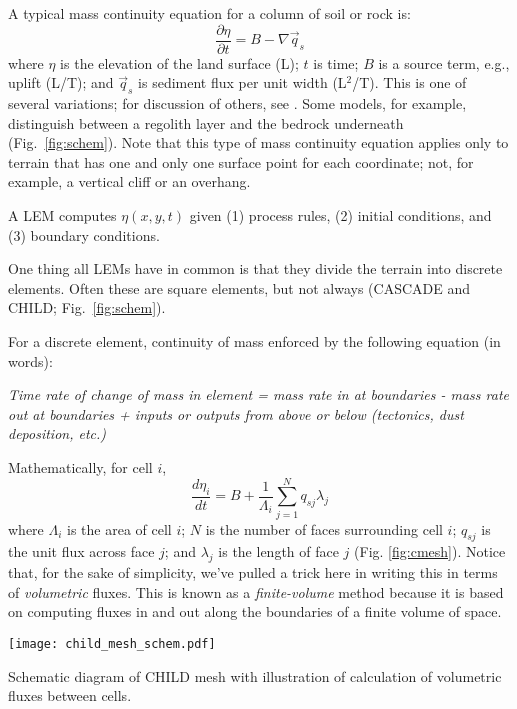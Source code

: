 \documentclass[12pt,reqno]{amsart}
\begin{document}
A typical mass continuity equation for a column of soil or rock is:
\begin{equation}
\frac{\partial \eta}{\partial t} = B - \nabla \vec{q}_s
\end{equation}
where $\eta$ is the elevation of the land surface (L); $t$ is time; $B$ is a source term, e.g., uplift (L/T); and $\vec{q}_s$ is sediment flux per unit width (L$^2$/T). This is one of several variations; for discussion of others, see \cite{tucker2010modelling}. Some models, for example, distinguish between a regolith layer and the bedrock underneath (Fig.~\ref{fig:schem}). Note that this type of mass continuity equation applies only to terrain that has one and only one surface point for each coordinate; not, for example, a vertical cliff or an overhang.

A LEM computes $\eta (x,y,t)$ given (1) process rules, (2) initial conditions, and (3) boundary conditions.

One thing all LEMs have in common is that they divide the terrain into discrete elements. Often these are square elements, but not always (CASCADE and CHILD; Fig.~\ref{fig:schem}).

For a discrete element, continuity of mass enforced by the following equation (in words):

{\em Time rate of change of mass in element = mass rate in at boundaries - mass rate out at boundaries + inputs or outputs from above or below (tectonics, dust deposition, etc.)}

Mathematically, for cell $i$,
\begin{equation}
\label{eq:finvol}
\frac{d\eta_i}{dt} = B + \frac{1}{\Lambda_i} \sum_{j=1}^N q_{sj} \lambda_j
\end{equation}
where $\Lambda_i$ is the area of cell $i$; $N$ is the number of faces surrounding cell $i$; $q_{sj}$ is the unit flux across face $j$; and $\lambda_j$ is the length of face $j$ (Fig. \ref{fig:cmesh}). Notice that, for the sake of simplicity, we've pulled a trick here in writing this in terms of {\em volumetric} fluxes. This is known as a {\em finite-volume} method because it is based on computing fluxes in and out along the boundaries of a finite volume of space.

\begin{floatingfigure}{171pt}
\centering
\texttt{[image: child\_mesh\_schem.pdf]}
\captionsetup{width=154pt}
\caption{Schematic diagram of CHILD mesh with illustration of calculation of volumetric fluxes between cells.}
\label{fig:cmesh}
\end{floatingfigure}
\end{document}
